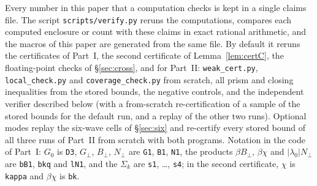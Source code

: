 \documentclass[11pt]{article}
\theoremstyle{remark}
\newcommand{\Gp}{G_{\perp}}
\newcommand{\Bp}{B_{\perp}}
\newcommand{\Np}{N_{\perp}}
\begin{document}
Every number in this paper that a computation checks is kept in a single claims file. The script
\texttt{scripts/verify.py} reruns the computations, compares each computed enclosure or count with these
claims in exact rational arithmetic, and the macros of this paper are generated from the same file.
By default it reruns the certificates of Part~I, the second certificate of Lemma~\ref{lem:certC}, the
floating-point checks of \S\ref{sec:cross}, and for Part~II: \texttt{weak\_cert.py},
\texttt{local\_check.py} and \texttt{coverage\_check.py} from scratch, all prism and closing inequalities
from the stored bounds, the negative controls, and the independent verifier described below (with a
from-scratch re-certification of a sample of the stored bounds for the default run, and a replay of the
other two runs). Optional modes replay the six-wave cells of \S\ref{sec:six} and re-certify every stored
bound of all three runs of Part~II from scratch with both programs. Notation in the code of Part~I: $G_0$
is \texttt{D3}, $\Gp$, $\Bp$, $\Np$ are \texttt{G1}, \texttt{B1}, \texttt{N1}, the products $\beta\Bp$,
$\beta\chi$ and $|\lambda_0|\Np$ are \texttt{bB1}, \texttt{bkq} and \texttt{lN1}, and the $\Sigma_k$ are
\texttt{s1}, \dots, \texttt{s4}; in the second certificate, $\chi$ is \texttt{kappa} and $\beta\chi$ is
\texttt{bk}.
\end{document}
